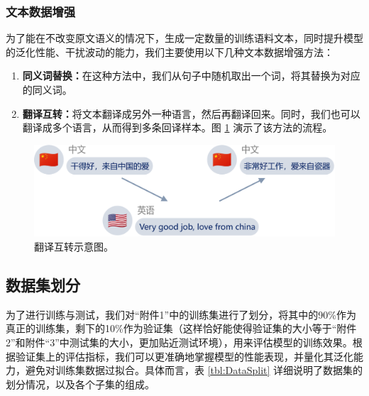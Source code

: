 \documentclass[a4paper]{zreport}
\begin{document}
\subsubsection{文本数据增强}

为了能在不改变原文语义的情况下，生成一定数量的训练语料文本，同时提升模型的泛化性能、干扰波动的能力，我们主要使用以下几种文本数据增强方法：

\begin{enumerate}
\item \textbf{同义词替换：}在这种方法中，我们从句子中随机取出一个词，将其替换为对应的同义词。
\item \textbf{翻译互转：}将文本翻译成另外一种语言，然后再翻译回来。同时，我们也可以翻译成多个语言，从而得到多条回译样本。图 \ref{fig:translate} 演示了该方法的流程。
\end{enumerate}

\begin{figure}[h]
\centering
\includegraphics[width=\linewidth]{figures/translate}
\caption{翻译互转示意图。}
\label{fig:translate}
\end{figure}


\subsection{数据集划分}

为了进行训练与测试，我们对“附件1”中的训练集进行了划分，将其中的90\%作为真正的训练集，剩下的10\%作为验证集（这样恰好能使得验证集的大小等于“附件2”和附件“3”中测试集的大小，更加贴近测试环境），用来评估模型的训练效果。根据验证集上的评估指标，我们可以更准确地掌握模型的性能表现，并量化其泛化能力，避免对训练集数据过拟合。具体而言，表 \ref{tbl:DataSplit} 详细说明了数据集的划分情况，以及各个子集的组成。
\end{document}

